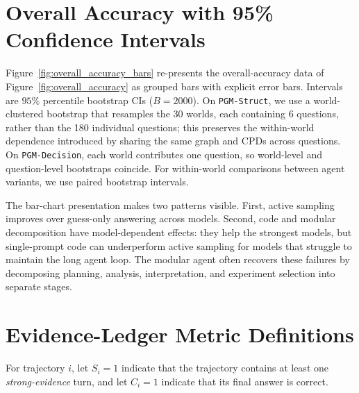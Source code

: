 \documentclass{article}
\begin{document}
\section{Overall Accuracy with 95\% Confidence Intervals}
\label{app:accuracy_cis}

Figure~\ref{fig:overall_accuracy_bars} re-presents the overall-accuracy data of Figure~\ref{fig:overall_accuracy} as grouped bars with explicit error bars.
Intervals are $95\%$ percentile bootstrap CIs ($B{=}2000$).
On \texttt{PGM-Struct}, we use a world-clustered bootstrap that resamples the 30 worlds, each containing 6 questions, rather than the 180 individual questions; this preserves the within-world dependence introduced by sharing the same graph and CPDs across questions.
On \texttt{PGM-Decision}, each world contributes one question, so world-level and question-level bootstraps coincide.
For within-world comparisons between agent variants, we use paired bootstrap intervals.

The bar-chart presentation makes two patterns visible.
First, active sampling improves over guess-only answering across models.
Second, code and modular decomposition have model-dependent effects: they help the strongest models, but single-prompt code can underperform active sampling for models that struggle to maintain the long agent loop.
The modular agent often recovers these failures by decomposing planning, analysis, interpretation, and experiment selection into separate stages.


\section{Evidence-Ledger Metric Definitions}
\label{app:ledger_definitions}

For trajectory $i$, let $S_i=1$ indicate that the trajectory contains at least one \emph{strong-evidence} turn, and let $C_i=1$ indicate that its final answer is correct.
\end{document}
